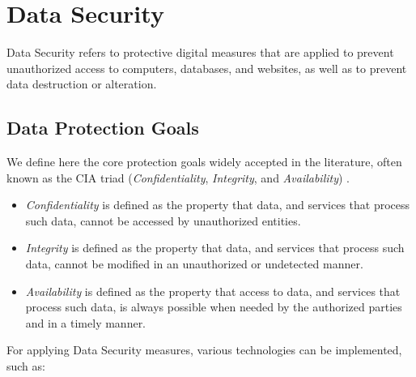 
\section{Data Security} 
\label{sec:DataSecurity}


Data Security refers to protective digital measures that are applied to prevent unauthorized access to computers, databases, and websites, as well as to prevent data destruction or alteration.


\subsection{Data Protection Goals}
\label{ssec:DataProtectionGoals}


We define here the core protection goals widely accepted in the literature, often known as the CIA triad (\textit{Confidentiality}, \textit{Integrity}, and \textit{Availability}) \cite{Hansen2015}.

\begin{itemize}
    \setlength\itemsep{1em}

    \item \textit{Confidentiality} is defined as the property that data, and services that process such data, cannot be accessed by unauthorized entities.

    \item \textit{Integrity} is defined as the property that data, and services that process such data, cannot be modified in an unauthorized or undetected manner.

    \item \textit{Availability} is defined as the property that access to data, and services that process such data, is always possible when needed by the authorized parties and in a timely manner.

\end{itemize}


For applying Data Security measures, various technologies can be implemented, such as:

